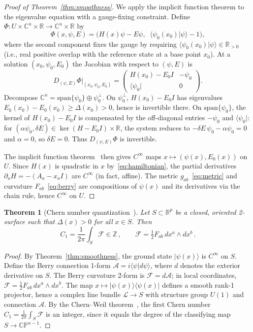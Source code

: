 \documentclass[3p]{elsarticle}
\newtheorem{theorem}{Theorem}
\newcommand{\ket}[1]{|#1\rangle}
\newcommand{\bra}[1]{\langle#1|}
\newcommand{\braket}[2]{\langle#1|#2\rangle}
\newcommand{\R}{\mathbb{R}}
\newcommand{\C}{\mathbb{C}}
\newcommand{\CP}{\mathbb{CP}}
\begin{document}
\begin{proof}[Proof of Theorem~\ref{thm:smoothness}]
We apply the implicit function theorem to the eigenvalue
equation with a gauge-fixing constraint.
Define $\Phi \colon U \times \C^n \times \R \to \C^n \times \R$ by
\[
  \Phi(x,\psi,E)
  = \bigl(H(x)\psi - E\psi,\;\; \braket{\psi_0(x_0)}{\psi} - 1\bigr),
\]
where the second component fixes the gauge by requiring
$\braket{\psi_0(x_0)}{\psi} \in \R_{>0}$ (i.e., real positive
overlap with the reference state at a base point $x_0$).  At a
solution $(x_0,\psi_0,E_0)$ the Jacobian with respect to
$(\psi,E)$ is
\[
  D_{(\psi,E)}\Phi\big|_{(x_0,\psi_0,E_0)}
  = \begin{pmatrix}
      H(x_0) - E_0 I & -\psi_0 \\[4pt]
      \bra{\psi_0} & 0
    \end{pmatrix}.
\]
Decompose $\C^n = \mathrm{span}\{\psi_0\} \oplus \psi_0^\perp$.
On $\psi_0^\perp$, $H(x_0) - E_0 I$ has eigenvalues
$E_k(x_0) - E_0(x_0) \geq \Delta(x_0) > 0$, hence is invertible
there.  On $\mathrm{span}\{\psi_0\}$, the kernel of $H(x_0) - E_0 I$
is compensated by the off-diagonal entries $-\psi_0$ and
$\bra{\psi_0}$: for $(\alpha\psi_0,\delta E) \in \ker(H-E_0I)\times\R$,
the system reduces to $-\delta E\,\psi_0 - \alpha\psi_0 = 0$ and
$\alpha = 0$, so $\delta E = 0$.  Thus $D_{(\psi,E)}\Phi$ is
invertible.

The implicit function theorem~\cite{kato1966} then gives
$C^\infty$ maps $x \mapsto (\psi(x), E_0(x))$ on $U$.
Since $H(x)$ is quadratic in $x$ by~\eqref{eq:hamiltonian},
the partial derivatives $\partial_a H = -(A_a - x_a I)$ are
$C^\infty$ (in fact, affine).  The metric
$g_{ab}$~\eqref{eq:metric} and curvature
$F_{ab}$~\eqref{eq:berry} are compositions of
$\psi(x)$ and its derivatives via the chain rule, hence
$C^\infty$ on $U$.
\end{proof}

\begin{theorem}[Chern number quantization~\cite{abanov2025}]%
\label{thm:chern}
Let $S \subset \R^p$ be a closed, oriented 2-surface such that
$\Delta(x) > 0$ for all $x \in S$.  Then
\begin{equation}\label{eq:chern}
  C_1 = \frac{1}{2\pi} \int_S \mathcal{F} \in \mathbb{Z}\,,
  \qquad \mathcal{F} = \tfrac{1}{2}F_{ab}\,dx^a \wedge dx^b\,.
\end{equation}
\end{theorem}
\begin{proof}
By Theorem~\ref{thm:smoothness}, the ground state
$\ket{\psi(x)}$ is $C^\infty$ on $S$.  Define the Berry connection
1-form $\mathcal{A} = i\braket{\psi}{d\psi}$, where $d$ denotes the
exterior derivative on $S$.  The Berry curvature 2-form is
$\mathcal{F} = d\mathcal{A}$; in local coordinates,
$\mathcal{F} = \tfrac{1}{2}F_{ab}\,dx^a \wedge dx^b$.
The map $x \mapsto \ket{\psi(x)}\bra{\psi(x)}$ defines a smooth
rank-1 projector, hence a complex line bundle $\mathcal{L} \to S$
with structure group $U(1)$ and connection $\mathcal{A}$.
By the Chern--Weil theorem~\cite{chern1946,nakahara2003}, the
first Chern number
$C_1 = \frac{1}{2\pi}\int_S \mathcal{F}$
is an integer, since it equals the degree of the classifying map
$S \to \CP^{n-1}$.
\end{proof}
\end{document}
